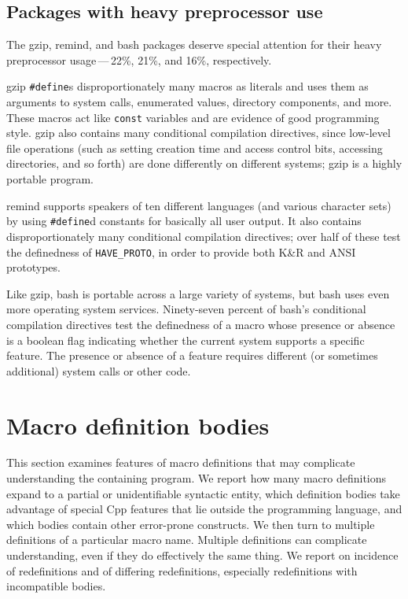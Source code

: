 \documentclass[10pt]{article}
\newcommand{\pkg}[1]{\textsf{#1}}
\begin{document}
\subsection{Packages with heavy preprocessor use}

The \pkg{gzip}, \pkg{remind}, and \pkg{bash} packages deserve
special attention for their heavy preprocessor usage\,---\,22\%, 21\%, and
16\%, respectively.

\pkg{gzip} {\tt \#define}s disproportionately many macros as literals and
uses them as arguments to system calls, enumerated values, directory
components, and more.  These macros act like {\tt const} variables and are
evidence of good programming style.  \pkg{gzip} also contains many
conditional compilation directives, since low-level file operations (such
as setting creation time and access control bits, accessing directories,
and so forth) are done differently on different systems; \pkg{gzip} is a
highly portable program.

\pkg{remind} supports speakers of ten different languages (and various
character sets) by using {\tt \#define}d constants for basically all user
output.  It also contains disproportionately many conditional compilation
directives; over half of these test the definedness of \verb|HAVE_PROTO|,
in order to provide both K\&R and ANSI prototypes.

Like \pkg{gzip}, \pkg{bash} is portable across a large variety of
systems, but \pkg{bash} uses even more operating system services.
Ninety-seven percent of \pkg{bash}'s conditional compilation directives
test the definedness of a macro whose presence or absence is a boolean
flag indicating whether the current system supports a specific feature.
The presence or absence of a feature requires different (or sometimes
additional) system calls or other code.


\section{Macro definition bodies}

This section examines features of macro definitions that may complicate
understanding the containing program.  We report how many macro definitions
expand to a partial or unidentifiable syntactic entity, which definition
bodies take advantage of special Cpp features that lie outside the
programming language, and which bodies contain other error-prone
constructs.  We then turn to multiple definitions of a particular macro
name.  Multiple definitions can complicate understanding, even if they do
effectively the same thing.  We report on incidence of redefinitions and of
differing redefinitions, especially redefinitions with incompatible bodies.
\end{document}
